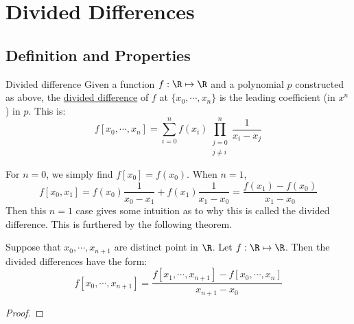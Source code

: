 \documentclass[../Main.tex]{subfiles}
\begin{document}
\section{Divided Differences}
\subsection{Definition and Properties}
\begin{definition}{Divided difference}
    Given a function $f : \R \mapsto \R$ and a polynomial $p$ constructed as above, the \underline{divided difference} of $f$ at $\{x_0, \cdots, x_n\}$ is the leading coefficient (in $x^n$) in $p$. This is:
    \begin{equation*}
        f[x_0, \cdots, x_n] = \sum_{i=0}^{n} f(x_i) \prod_{\substack{j=0\\j \neq i}}^{n} \frac{1}{x_i - x_j}
    \end{equation*}
\end{definition}
\begin{example}
    For $n = 0$, we simply find $f[x_0] = f(x_0)$. When $n = 1$,
    \begin{equation*}
        f[x_0, x_1] = f(x_0) \frac{1}{x_0-x_1} + f(x_1) \frac{1}{x_1-x_0} = \frac{f(x_1) - f(x_0)}{x_1-x_0}
    \end{equation*}
    Then this $n = 1$ case gives some intuition as to why this is called the divided difference. This is furthered by the following theorem.
    \label{expDivDiff}
\end{example}
\begin{theorem}
    Suppose that $x_0, \cdots, x_{n+1}$ are distinct point in $\R$. Let $f : \R \mapsto \R$. Then the divided differences have the form:
    \begin{equation}
        f[x_0, \cdots, x_{n+1}] = \frac{f[x_1, \cdots, x_{n+1}] - f[x_0, \cdots, x_n]}{x_{n+1} - x_0}
        \label{eqnDivDiffRecurse}
    \end{equation}
    \label{thmDivDiffRecurse}
\end{theorem}
\begin{proof}
\end{proof}
\end{document}
